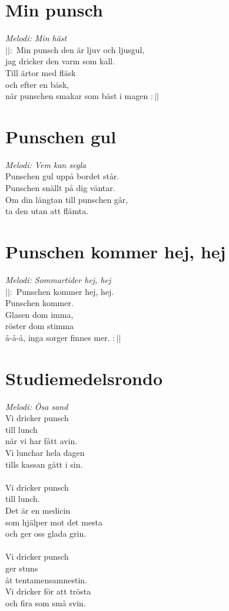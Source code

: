 \newpage
\section{Min punsch}
\textit{Melodi: Min häst}
\vspace{2mm}\\
$||:$ Min punsch den är ljuv och ljusgul,\\
jag dricker den varm som kall.\\
Till ärtor med fläsk\\
och efter en bäsk,\\
när punschen smakar som bäst i magen $:||$

\section{Punschen gul}
\textit{Melodi: Vem kan segla}
\vspace{2mm}\\
Punschen gul uppå bordet står.\\
Punschen snällt på dig väntar.\\
Om din längtan till punschen går,\\
ta den utan att flämta.

\section{Punschen kommer hej, hej}
\textit{Melodi: Sommartider hej, hej}
\vspace{2mm}\\
$||:$ Punschen kommer hej, hej.\\
Punschen kommer.\\
Glasen dom imma,\\
röster dom stimma\\
å-å-å, inga sorger finnes mer. $:||$

\newpage
\section{Studiemedelsrondo}
\textit{Melodi: Ösa sand}
\vspace{2mm}\\
Vi dricker punsch\\
till lunch\\
när vi har fått avin.\\
Vi lunchar hela dagen\\
tills kassan gått i sin.\\
\\
Vi dricker punsch\\
till lunch.\\
Det är en medicin\\
som hjälper mot det mesta\\
och ger oss glada grin.\\
\\
Vi dricker punsch\\
ger stuns\\
åt tentamensamnestin.\\
Vi dricker för att trösta\\
och fira som små svin.

